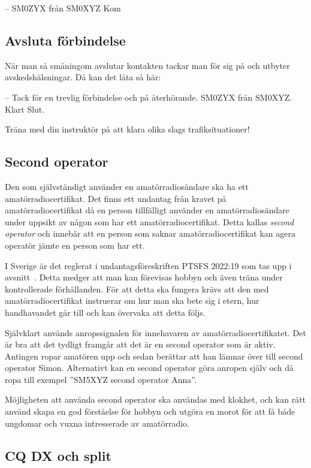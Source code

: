 -- SM0ZYX från SM0XYZ Kom

\subsection{Avsluta förbindelse}

När man så småningom avslutar kontakten tackar man för sig på och utbyter
avskedshälsningar. Då kan det låta så här:

-- Tack för en trevlig förbindelse och på återhörande. SM0ZYX från
SM0XYZ. Klart Slut.

Träna med din instruktör på att klara olika slags trafiksituationer!

\subsection{Second operator}
\label{secondoperator}

Den som självständigt använder en amatörradiosändare ska ha ett
amatörradiocertifikat.
Det finns ett undantag från kravet på amatörradiocertifikat då en person
tillfälligt använder en amatörradiosändare under uppsikt av någon som har ett
amatörradiocertifikat.
Detta kallas \emph{second operator} och innebär att en person som saknar
amatörradiocertifikat kan agera operatör jämte en person som har ett.

I Sverige är det reglerat i undantagsföreskriften PTSFS 2022:19 som tas upp i
avsnitt~.
Detta medger att man kan förevisas hobbyn och även träna under kontrollerade
förhållanden.
För att detta ska fungera krävs att den med amatörradiocertifikat instruerar
om hur man ska bete sig i etern, hur handhavandet går till och kan övervaka
att detta följs.

Självklart används anropssignalen för innehavaren av amatörradiocertifikatet.
Det är bra att det tydligt framgår att det är en second operator som är aktiv.
Antingen ropar amatören upp och sedan berättar att han lämnar över till second
operator Simon.
Alternativt kan en second operator göra anropen själv och då ropa till exempel
''SM5XYZ second operator Anna''.

Möjligheten att använda second operator ska användas med klokhet, och kan rätt
använd skapa en god förståelse för hobbyn och utgöra en morot för att få både
ungdomar och vuxna intresserade av amatörradio.

\subsection{CQ DX och split}
\label{cq dx och split}

